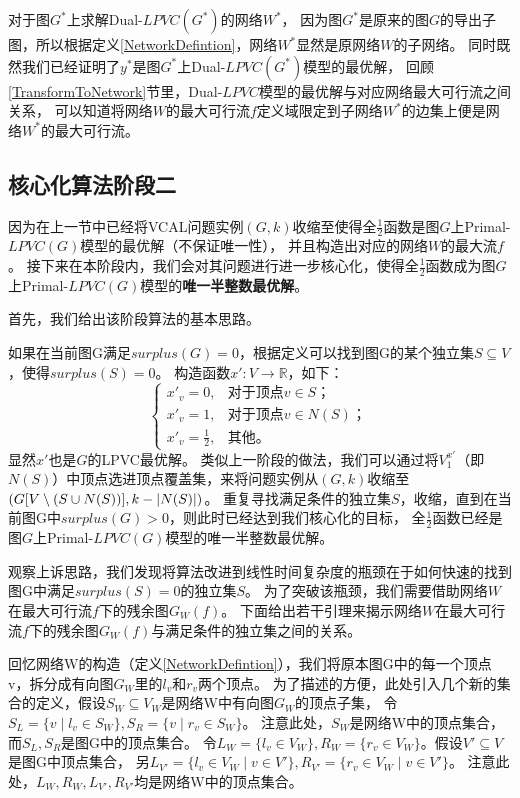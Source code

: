 对于图$G^*$上求解Dual-$LPVC(G^*)$的网络$W^*$，
因为图$G^*$是原来的图$G$的导出子图，所以根据定义\ref{NetworkDefintion}，网络$W^*$显然是原网络$W$的子网络。
同时既然我们已经证明了$y^*$是图$G^*$上Dual-$LPVC(G^*)$模型的最优解，
回顾\ref{TransformToNetwork}节里，Dual-$LPVC$模型的最优解与对应网络最大可行流之间关系，
可以知道将网络$W$的最大可行流$f$定义域限定到子网络$W^*$的边集上便是网络$W^*$的最大可行流。

\subsection{核心化算法阶段二}
因为在上一节中已经将VCAL问题实例$(G, k)$收缩至使得全$\frac{1}{2}$函数是图$G$上Primal-$LPVC(G)$模型的最优解（不保证唯一性），
并且构造出对应的网络$W$的最大流$f$。
接下来在本阶段内，我们会对其问题进行进一步核心化，使得全$\frac{1}{2}$函数成为图$G$上Primal-$LPVC(G)$模型的\textbf{唯一半整数最优解}。
\vspace{0.5cm}

首先，我们给出该阶段算法的基本思路。

如果在当前图G满足$surplus(G) = 0$，根据定义可以找到图G的某个独立集$S \subseteq V$，使得$surplus(S) = 0$。
构造函数$x':V \rightarrow \mathbb{R}$，如下：
\begin{equation*}
   \begin{cases}
            x'_v =0, & \mbox{对于顶点$v \in S$；}  \\
            x'_v =1, & \mbox{对于顶点$v \in N(S)$；}  \\
            x'_v =\frac{1}{2}, & \mbox{其他。}
          \end{cases}
\end{equation*}
显然$x'$也是$G$的LPVC最优解。
类似上一阶段的做法，我们可以通过将$V^{x'}_1$（即$N(S)$）中顶点选进顶点覆盖集，来将问题实例从$(G,k)$收缩至$(G[V\setminus(S \cup N(S))], k - \left\vert N(S) \right\vert)$。
重复寻找满足条件的独立集$S$，收缩，直到在当前图G中$surplus(G) > 0$，则此时已经达到我们核心化的目标，
全$\frac{1}{2}$函数已经是图$G$上Primal-$LPVC(G)$模型的唯一半整数最优解。

观察上诉思路，我们发现将算法改进到线性时间复杂度的瓶颈在于如何快速的找到图G中满足$surplus(S) = 0$的独立集$S$。
为了突破该瓶颈，我们需要借助网络$W$在最大可行流$f$下的残余图$G_W(f)$。
下面给出若干引理来揭示网络$W$在最大可行流$f$下的残余图$G_W(f)$与满足条件的独立集之间的关系。

回忆网络W的构造（定义\ref{NetworkDefintion}），我们将原本图G中的每一个顶点v，拆分成有向图$G_W$里的$l_v$和$r_v$两个顶点。
为了描述的方便，此处引入几个新的集合的定义，假设$S_W \subseteq V_W$是网络W中有向图$G_W$的顶点子集，
令$S_L = \{v\;|\;l_v \in S_W\},S_R = \{v\;|\;r_v \in S_W\}$。
注意此处，$S_W$是网络W中的顶点集合，而$S_L, S_R$是图G中的顶点集合。
令$L_W = \{l_v \in V_W\}, R_W = \{r_v \in V_W\}$。假设$V' \subseteq V$是图G中顶点集合，
另$L_{V'} = \{l_v\in V_W\;|\;v \in V'\},R_{V'} = \{r_v\in V_W\;|\;v \in V'\}$。
注意此处，$L_W, R_W, L_{V'}, R_{V'}$均是网络W中的顶点集合。

